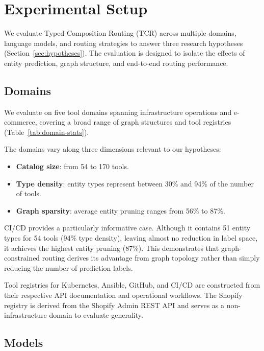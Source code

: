 
\section{Experimental Setup}
\label{sec:experimental-setup}

We evaluate Typed Composition Routing (TCR) across multiple domains, language models, and routing strategies to answer three research hypotheses (Section~\ref{sec:hypotheses}). The evaluation is designed to isolate the effects of entity prediction, graph structure, and end-to-end routing performance.

\subsection{Domains}
\label{sec:domains}

We evaluate on five tool domains spanning infrastructure operations and e-commerce, covering a broad range of graph structures and tool registries (Table~\ref{tab:domain-stats}).



The domains vary along three dimensions relevant to our hypotheses:

\begin{itemize}
    \item \textbf{Catalog size}: from 54 to 170 tools.
    \item \textbf{Type density}: entity types represent between 30\% and 94\% of the number of tools.
    \item \textbf{Graph sparsity}: average entity pruning ranges from 56\% to 87\%.
\end{itemize}

CI/CD provides a particularly informative case.
Although it contains 51 entity types for 54 tools (94\% type density), leaving almost no reduction in label space, it achieves the highest entity pruning (87\%).
This demonstrates that graph-constrained routing derives its advantage from graph topology rather than simply reducing the number of prediction labels.

Tool registries for Kubernetes, Ansible, GitHub, and CI/CD are constructed from their respective API documentation and operational workflows.
The Shopify registry is derived from the Shopify Admin REST API and serves as a non-infrastructure domain to evaluate generality.

\subsection{Models}
\label{sec:models}

